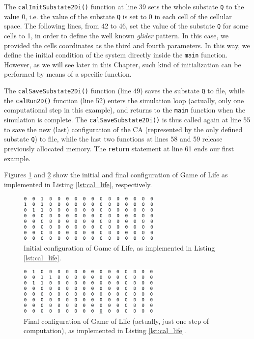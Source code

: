The \verb'calInitSubstate2Di()' function at line 39 sets the whole
substate \verb'Q' to the value 0, i.e. the value of the substate
\verb'Q' is set to 0 in each cell of the cellular space. The following
lines, from 42 to 46, set the value of the substate \verb'Q' for some
cells to 1, in order to define the well known \emph{glider} pattern. In
this case, we provided the cells coordinates as the third and fourth
parameters. In this way, we define the initial condition of the system
directly inside the \verb'main' function. However, as we will see later
in this Chapter, such kind of initialization can be performed by means
of a specific function.

The \verb'calSaveSubstate2Di()' function (line 49) saves the substate
\verb'Q' to file, while the \verb'calRun2D()' function (line 52)
enters the simulation loop (actually, only one computational step in
this example), and returns to the \verb'main' function when the
simulation is complete. The \verb'calSaveSubstate2Di()' is thus called
again at line 55 to save the new (last) configuration of the CA
(represented by the only defined substate \verb'Q') to file, while the
last two functions at lines 58 and 59 release previously allocated
memory. The \verb'return' statement at line 61 ends our first example.

Figures \ref{fig:life_0000} and \ref{fig:life_LAST} show the initial and final configuration of Game of Life as implemented in Listing \ref{lst:cal_life}, respectively.

\begin{figure}
  \begin{center}
    \includegraphics[width=7cm]{./images/OpenCAL/life_0000}
    \caption{Initial configuration of Game of Life, as implemented in Listing \ref{lst:cal_life}.}
    \label{fig:life_0000}
  \end{center}
\end{figure}

\begin{figure}
  \begin{center}
    \includegraphics[width=7cm]{./images/OpenCAL/life_LAST}
    \caption{Final configuration of Game of Life (actually, just one step of computation), as implemented in Listing \ref{lst:cal_life}.}
    \label{fig:life_LAST}
  \end{center}
\end{figure}

